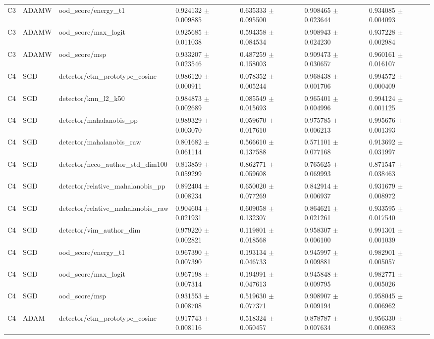 \begin{longtable}{lllllll}
C3 & ADAMW & ood\_score/energy\_t1 & 0.924132 $\pm$ 0.009885 & 0.635333 $\pm$ 0.095500 & 0.908465 $\pm$ 0.023644 & 0.934085 $\pm$ 0.004093 \\
C3 & ADAMW & ood\_score/max\_logit & 0.925685 $\pm$ 0.011038 & 0.594358 $\pm$ 0.084534 & 0.908943 $\pm$ 0.024230 & 0.937228 $\pm$ 0.002984 \\
C3 & ADAMW & ood\_score/msp & 0.933207 $\pm$ 0.023546 & 0.487259 $\pm$ 0.158003 & 0.909473 $\pm$ 0.030657 & 0.960161 $\pm$ 0.016107 \\
C4 & SGD & detector/ctm\_prototype\_cosine & 0.986120 $\pm$ 0.000911 & 0.078352 $\pm$ 0.005244 & 0.968438 $\pm$ 0.001706 & 0.994572 $\pm$ 0.000409 \\
C4 & SGD & detector/knn\_l2\_k50 & 0.984873 $\pm$ 0.002689 & 0.085549 $\pm$ 0.015693 & 0.965401 $\pm$ 0.004996 & 0.994124 $\pm$ 0.001125 \\
C4 & SGD & detector/mahalanobis\_pp & 0.989329 $\pm$ 0.003070 & 0.059670 $\pm$ 0.017610 & 0.975785 $\pm$ 0.006213 & 0.995676 $\pm$ 0.001393 \\
C4 & SGD & detector/mahalanobis\_raw & 0.801682 $\pm$ 0.061114 & 0.566610 $\pm$ 0.137588 & 0.571101 $\pm$ 0.077168 & 0.913692 $\pm$ 0.031997 \\
C4 & SGD & detector/neco\_author\_std\_dim100 & 0.813859 $\pm$ 0.059299 & 0.862771 $\pm$ 0.059608 & 0.765625 $\pm$ 0.069993 & 0.871547 $\pm$ 0.038463 \\
C4 & SGD & detector/relative\_mahalanobis\_pp & 0.892404 $\pm$ 0.008234 & 0.650020 $\pm$ 0.077269 & 0.842914 $\pm$ 0.006937 & 0.931679 $\pm$ 0.008972 \\
C4 & SGD & detector/relative\_mahalanobis\_raw & 0.904604 $\pm$ 0.021931 & 0.609058 $\pm$ 0.132307 & 0.864621 $\pm$ 0.021261 & 0.933595 $\pm$ 0.017540 \\
C4 & SGD & detector/vim\_author\_dim & 0.979220 $\pm$ 0.002821 & 0.119801 $\pm$ 0.018568 & 0.958307 $\pm$ 0.006100 & 0.991301 $\pm$ 0.001039 \\
C4 & SGD & ood\_score/energy\_t1 & 0.967390 $\pm$ 0.007390 & 0.193134 $\pm$ 0.046733 & 0.945997 $\pm$ 0.009881 & 0.982901 $\pm$ 0.005057 \\
C4 & SGD & ood\_score/max\_logit & 0.967198 $\pm$ 0.007314 & 0.194991 $\pm$ 0.047613 & 0.945848 $\pm$ 0.009795 & 0.982771 $\pm$ 0.005026 \\
C4 & SGD & ood\_score/msp & 0.931553 $\pm$ 0.008708 & 0.519630 $\pm$ 0.077371 & 0.908907 $\pm$ 0.009194 & 0.958045 $\pm$ 0.006962 \\
C4 & ADAM & detector/ctm\_prototype\_cosine & 0.917743 $\pm$ 0.008116 & 0.518324 $\pm$ 0.050457 & 0.878787 $\pm$ 0.007634 & 0.956330 $\pm$ 0.006983 \\

\end{longtable}
